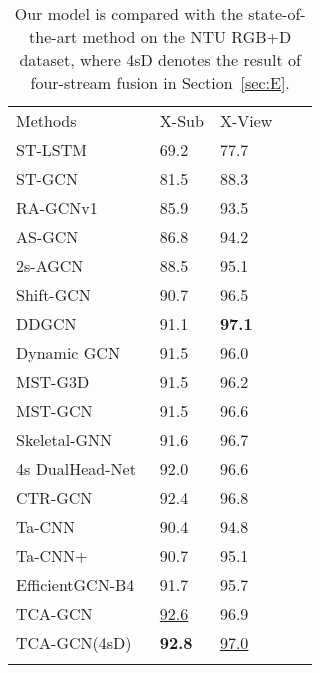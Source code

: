 \documentclass[letterpaper]{article} \usepackage[submission]{aaai23}  \usepackage{times}  \usepackage{helvet}  \usepackage{courier}  \usepackage[hyphens]{url}  \usepackage{graphicx} \urlstyle{rm} \def\UrlFont{\rm}  \usepackage{natbib}  \usepackage{caption} \frenchspacing  \setlength{\pdfpagewidth}{8.5in} \setlength{\pdfpageheight}{11in} \usepackage{algorithm}
\begin{document}
\begin{table}[ht]
\centering
\begin{tabular}{lllll}
\hline\noalign{\smallskip}
Methods & X-Sub &X-View\\
\noalign{\smallskip}\hline\noalign{\smallskip}
ST-LSTM~\citeyearpar{2016Spatio}&69.2&77.7\\
ST-GCN~\citeyearpar{DBLP:conf/aaai/YanXL18}&81.5&88.3\\
RA-GCNv1~\citeyearpar{2019Richly}&85.9&93.5\\
AS-GCN~\citeyearpar{2019Actional}&86.8&94.2\\
2s-AGCN~\citeyearpar{2018Two}&88.5&95.1\\



Shift-GCN~\citeyearpar{2020Skeletonshift}&90.7&96.5\\
DDGCN~\citeyearpar{20201Skeleton} & 91.1 & {\bf 97.1} \\
Dynamic GCN~\citeyearpar{2020Dynamic}&91.5&96.0\\
MST-G3D~\citeyearpar{2020Disentangling}& 91.5 & 96.2 \\
MST-GCN~\citeyearpar{2021Multi} & 91.5 & 96.6 \\
Skeletal-GNN~\citeyearpar{2021Learning}&91.6&96.7\\
4s DualHead-Net~\citeyearpar{2021Learning1}&92.0&96.6\\
CTR-GCN~\citeyearpar{2021Channel}&92.4&96.8\\
Ta-CNN~\citeyearpar{xu2022topology}&90.4&94.8\\
Ta-CNN+~\citeyearpar{xu2022topology}&90.7&95.1\\
EfficientGCN-B4~\citeyearpar{2021Constructing}&91.7&95.7\\
\noalign{\smallskip}\hline
TCA-GCN&\underline{92.6}&96.9\\
TCA-GCN(4sD)&{\bf 92.8}&\underline{97.0}\\
\noalign{\smallskip}\hline
\end{tabular}
\caption{Our model is compared with the state-of-the-art method on the NTU RGB+D dataset, where 4sD denotes the result of four-stream fusion in Section~\ref{sec:E}.}
\label{tab:32} 
\end{table}
\end{document}
